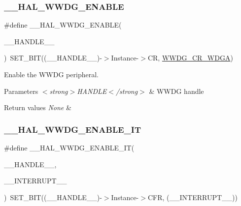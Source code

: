 \subsubsection{\texorpdfstring{\+\_\+\+\_\+\+H\+A\+L\+\_\+\+W\+W\+D\+G\+\_\+\+E\+N\+A\+B\+LE}{\_\_HAL\_WWDG\_ENABLE}}
{\footnotesize\ttfamily \#define \+\_\+\+\_\+\+H\+A\+L\+\_\+\+W\+W\+D\+G\+\_\+\+E\+N\+A\+B\+LE(\begin{DoxyParamCaption}\item[{}]{\+\_\+\+\_\+\+H\+A\+N\+D\+L\+E\+\_\+\+\_\+ }\end{DoxyParamCaption})~S\+E\+T\+\_\+\+B\+IT((\+\_\+\+\_\+\+H\+A\+N\+D\+L\+E\+\_\+\+\_\+)-\/$>$Instance-\/$>$CR, \hyperlink{group___peripheral___registers___bits___definition_gab647e9997b8b8e67de72af1aaea3f52f}{W\+W\+D\+G\+\_\+\+C\+R\+\_\+\+W\+D\+GA})}



Enable the W\+W\+DG peripheral. 


\begin{DoxyParams}{Parameters}
{\em $<$strong$>$\+H\+A\+N\+D\+L\+E$<$/strong$>$} & W\+W\+DG handle \\
\hline
\end{DoxyParams}

\begin{DoxyRetVals}{Return values}
{\em None} & \\
\hline
\end{DoxyRetVals}
\mbox{\label{group___w_w_d_g___exported___macros_ga62d4eb6a7921d6f729e7a69448eac38a}} 
\subsubsection{\texorpdfstring{\+\_\+\+\_\+\+H\+A\+L\+\_\+\+W\+W\+D\+G\+\_\+\+E\+N\+A\+B\+L\+E\+\_\+\+IT}{\_\_HAL\_WWDG\_ENABLE\_IT}}
{\footnotesize\ttfamily \#define \+\_\+\+\_\+\+H\+A\+L\+\_\+\+W\+W\+D\+G\+\_\+\+E\+N\+A\+B\+L\+E\+\_\+\+IT(\begin{DoxyParamCaption}\item[{}]{\+\_\+\+\_\+\+H\+A\+N\+D\+L\+E\+\_\+\+\_\+,  }\item[{}]{\+\_\+\+\_\+\+I\+N\+T\+E\+R\+R\+U\+P\+T\+\_\+\+\_\+ }\end{DoxyParamCaption})~S\+E\+T\+\_\+\+B\+IT((\+\_\+\+\_\+\+H\+A\+N\+D\+L\+E\+\_\+\+\_\+)-\/$>$Instance-\/$>$C\+FR, (\+\_\+\+\_\+\+I\+N\+T\+E\+R\+R\+U\+P\+T\+\_\+\+\_\+))}



